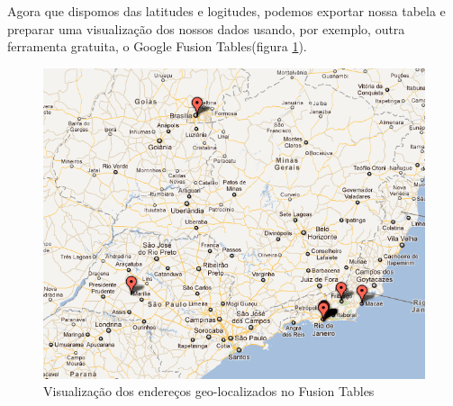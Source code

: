 \documentclass[a4paper,10pt]{report}
\begin{document}
Agora que dispomos das latitudes e logitudes, podemos exportar nossa tabela e preparar uma visualização dos nossos dados usando, por exemplo, outra ferramenta gratuita, o Google Fusion Tables(figura \ref{fig:fusiont}).

\begin{figure}[h!]
 \includegraphics[width=12cm]{./fusiontables.png}
 \caption{Visualização dos endereços geo-localizados no Fusion Tables}
 \label{fig:fusiont}
\end{figure}
\end{document}

